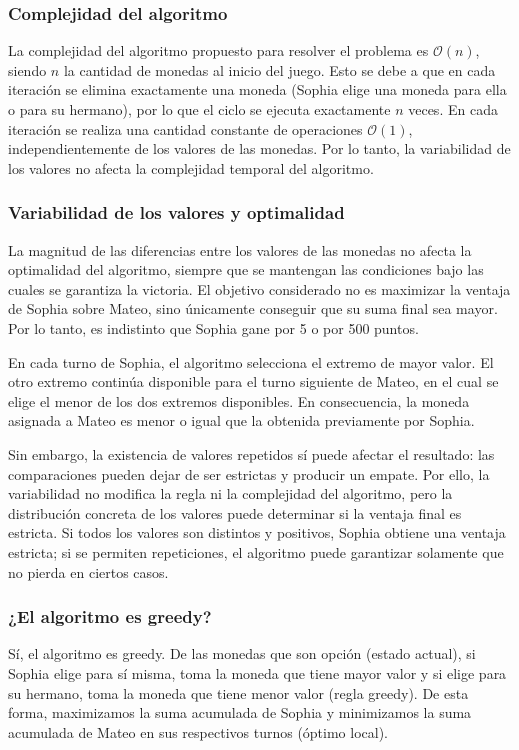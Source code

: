 \subsubsection{Complejidad del algoritmo}

La complejidad del algoritmo propuesto para resolver el problema es $\mathcal{O}(n)$, siendo $n$ la cantidad de monedas al inicio del juego. Esto se debe a que en cada iteración se elimina exactamente una moneda (Sophia elige una moneda para ella o para su hermano), por lo que el ciclo se ejecuta exactamente $n$ veces. En cada iteración se realiza una cantidad constante de operaciones $\mathcal{O}(1)$, independientemente de los valores de las monedas. Por lo tanto, la variabilidad de los valores no afecta la complejidad temporal del algoritmo.

\subsubsection{Variabilidad de los valores y optimalidad}

La magnitud de las diferencias entre los valores de las monedas no afecta la optimalidad del algoritmo, siempre que se mantengan las condiciones bajo las cuales se garantiza la victoria. El objetivo considerado no es maximizar la ventaja de Sophia sobre Mateo, sino únicamente conseguir que su suma final sea mayor. Por lo tanto, es indistinto que Sophia gane por 5 o por 500 puntos.

En cada turno de Sophia, el algoritmo selecciona el extremo de mayor valor. El otro extremo continúa disponible para el turno siguiente de Mateo, en el cual se elige el menor de los dos extremos disponibles. En consecuencia, la moneda asignada a Mateo es menor o igual que la obtenida previamente por Sophia.

Sin embargo, la existencia de valores repetidos sí puede afectar el resultado: las comparaciones pueden dejar de ser estrictas y producir un empate. Por ello, la variabilidad no modifica la regla ni la complejidad del algoritmo, pero la distribución concreta de los valores puede determinar si la ventaja final es estricta. Si todos los valores son distintos y positivos, Sophia obtiene una ventaja estricta; si se permiten repeticiones, el algoritmo puede garantizar solamente que no pierda en ciertos casos.



\subsubsection{¿El algoritmo es greedy?}
Sí, el algoritmo es greedy. De las monedas que son opción (estado actual), si Sophia elige para sí misma, toma la moneda que tiene mayor valor y si elige para su hermano, toma la moneda que tiene menor valor (regla greedy). De esta forma, maximizamos la suma acumulada de Sophia y minimizamos la suma acumulada de Mateo en sus respectivos turnos (óptimo local).

